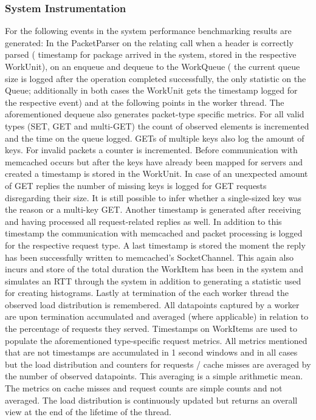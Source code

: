     \subsubsection{System Instrumentation}
        For the following events in the system performance benchmarking results are generated: In the PacketParser on
        the relating call when a header is correctly parsed (\textrightarrow{} timestamp for package arrived in the
        system, stored in the respective WorkUnit), on an enqueue and dequeue to the WorkQueue (\textrightarrow{} the
        current queue size is logged after the operation completed successfully, the only statistic on the Queue;
        additionally in both cases the WorkUnit gets the timestamp logged for the respective event) and at the following
        points in the worker thread. The aforementioned dequeue also generates packet-type specific metrics. For all
        valid types (SET, GET and multi-GET) the count of observed elements is incremented and the time on the queue
        logged. GETs of multiple keys also log the amount of keys. For invalid packets a counter is incremented. Before
        communication with memcached occurs but after the keys have already been mapped for servers and created a
        timestamp is stored in the WorkUnit. In case of an unexpected amount of GET replies the number of missing keys
        is logged for GET requests disregarding their size. It is still possible to infer whether a single-sized key was
        the reason or a multi-key GET. Another timestamp is generated after receiving and having processed all
        request-related replies as well. In addition to this timestamp the communication with memcached and packet
        processing is logged for the respective request type. A last timestamp is stored the moment the reply has been
        successfully written to memcached's SocketChannel. This again also incurs and store of the total duration the
        WorkItem has been in the system and simulates an RTT through the system in addition to generating a statistic
        used for creating histograms. Lastly at termination of the each worker thread the observed load distribution is
        remembered. All datapoints captured by a worker are upon termination accumulated and averaged (where applicable)
        in relation to the percentage of requests they served.\newline
        Timestamps on WorkItems are used to populate the aforementioned type-specific request metrics. All metrics
        mentioned that are not timestamps are accumulated in 1 second windows and in all cases but the load distribution
        and counters for requests / cache misses are averaged by the number of observed datapoints. This averaging is a
        simple arithmetic mean. The metrics on cache misses and request counts are simple counts and not averaged. The
        load distribution is continuously updated but returns an overall view at the end of the lifetime of the thread.

